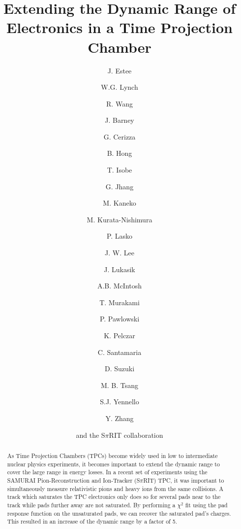 \documentclass[review]{elsarticle}
\begin{document}
\begin{frontmatter}

\title{Extending the Dynamic Range of Electronics in a Time Projection Chamber}


\author[msu,nscl]{J. Estee}
\author[msu,nscl]{W.G. Lynch}
\author[china1,china2]{R. Wang}
\author[msu,nscl]{J. Barney}
\author[msu,nscl]{G. Cerizza}
\author[kor]{B. Hong}
\author[riken]{T. Isobe}
\author[nscl]{G. Jhang}
\author[kyoto]{M. Kaneko}
\author[riken]{M. Kurata-Nishimura}
\author[krakow]{P. Lasko}
\author[kor]{J. W. Lee}
\author[krakow]{J. Lukasik}
\author[a&m]{A.B. McIntosh}
\author[kyoto]{T. Murakami}
\author[krakow]{P. Pawlowski}
\author[poland]{K. Pelczar}
\author[nscl]{C. Santamaria}
\author[riken]{D. Suzuki}
\author[nscl]{M. B. Tsang}
\author[a&m]{S.J. Yennello}
\author[tsing]{Y. Zhang}
\author[]{and the S$\pi$RIT collaboration}

\address[msu]{Michigan State University, Dept. Physics and Astronomy }
\address[nscl]{National Superconducting Cyclotron Laboratory}
\address[kor]{Department of Physics, Korea University}
\address[riken]{RIKEN Nishina Center}
\address[kyoto]{Department of Physics, Kyoto University}
\address[krakow]{IFJ PAN, Krak\'{o}w}
\address[a&m]{Dept. of Physics and Astronomy, Texas A$\&$M University}
\address[tsing]{Department of Physics, Tsinghua University}
\address[poland]{Faculty of Physics, Astronomy and Applied Computer Science, Jagiellonian University}
\address[china1]{State Key Laboratory of Radiation Medicine and Protection, School of Radiation Medicine and Protection, Soochow University, Suzhou 215123, China}
\address[china2]{Collaborative Innovation Center of Radiological Medicine of Jiangsu Higher Education Institutions, Suzhou 215123, China}



\begin{abstract}
As Time Projection Chambers (TPCs) become widely used in low to intermediate nuclear physics experiments,  it becomes important to extend the dynamic range to cover  the large range in energy losses. In a recent set of experiments using the SAMURAI Pion-Reconstruction and Ion-Tracker (S$\pi$RIT) TPC, it was important to simultaneously measure relativistic pions and heavy ions from the same collisions. A track which saturates the TPC electronics only does so for several pads near to the track while pads further away are not saturated. By performing a $\chi^2$ fit using the pad response function on the unsaturated pads, we can recover the saturated pad's charges. This resulted in an increase of the dynamic range by a factor of 5. 
\end{abstract}


\end{frontmatter}
\end{document}
